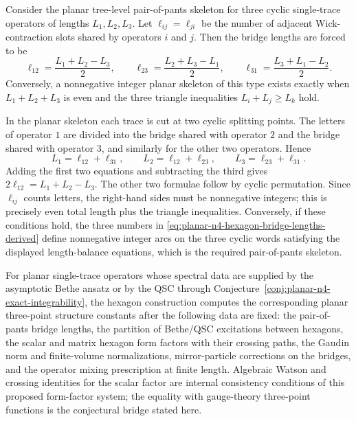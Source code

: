 \begin{remark}
\label{rem:planar-n4-hexagon-bridge-lengths}
Consider the planar tree-level pair-of-pants skeleton for three cyclic
single-trace operators of lengths \(L_1,L_2,L_3\).  Let \(\ell_{ij}=\ell_{ji}\)
be the number of adjacent Wick-contraction slots shared by operators \(i\)
and \(j\).  Then the bridge lengths are forced to be
\begin{equation}
  \ell_{12}=\frac{L_1+L_2-L_3}{2},\qquad
  \ell_{23}=\frac{L_2+L_3-L_1}{2},\qquad
  \ell_{31}=\frac{L_3+L_1-L_2}{2}.
  \label{eq:planar-n4-hexagon-bridge-lengths-derived}
\end{equation}
Conversely, a nonnegative integer planar skeleton of this type exists exactly
when \(L_1+L_2+L_3\) is even and the three triangle inequalities
\(L_i+L_j\geq L_k\) hold.

In the planar skeleton each trace is cut at two cyclic splitting points.  The
letters of operator \(1\) are divided into the bridge shared with operator
\(2\) and the bridge shared with operator \(3\), and similarly for the other
two operators.  Hence
\[
  L_1=\ell_{12}+\ell_{31},\qquad
  L_2=\ell_{12}+\ell_{23},\qquad
  L_3=\ell_{23}+\ell_{31}.
\]
Adding the first two equations and subtracting the third gives
\(2\ell_{12}=L_1+L_2-L_3\).  The other two formulae follow by cyclic
permutation.  Since \(\ell_{ij}\) counts letters, the right-hand sides must
be nonnegative integers; this is precisely even total length plus the
triangle inequalities.  Conversely, if these conditions hold, the three
numbers in \eqref{eq:planar-n4-hexagon-bridge-lengths-derived} define
nonnegative integer arcs on the three cyclic words satisfying the displayed
length-balance equations, which is the required pair-of-pants skeleton.
\end{remark}

\begin{conjecture}
\label{conj:planar-n4-hexagon-three-point-bridge}
For planar single-trace operators whose spectral data are supplied by the
asymptotic Bethe ansatz or by the QSC through
Conjecture~\ref{conj:planar-n4-exact-integrability}, the hexagon construction
computes the corresponding planar three-point structure constants after the
following data are fixed: the pair-of-pants bridge lengths, the partition of
Bethe/QSC excitations between hexagons, the scalar and matrix hexagon form
factors with their crossing paths, the Gaudin norm and finite-volume
normalizations, mirror-particle corrections on the bridges, and the operator
mixing prescription at finite length.  Algebraic Watson and crossing identities
for the scalar factor are internal consistency conditions of this proposed
form-factor system; the equality with gauge-theory three-point functions is the
conjectural bridge stated here.
\end{conjecture}

